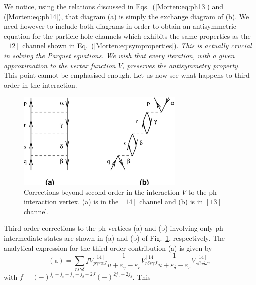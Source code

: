 We notice, using the relations discussed
in Eqs.~(\ref{Morten:eq:ph13})
and (\ref{Morten:eq:ph14}), that diagram (a) is simply the 
exchange diagram of (b). We need however to include
both diagrams in order to obtain an
antisymmetric equation for the particle-hole channels
which exhibits the same properties as the $[12]$ channel
shown in Eq.~(\ref{Morten:eq:symproperties}). {\em This is actually crucial
in solving the Parquet equations. We wish that 
every iteration, with a given approximation to the 
vertex function $V$, preserves the antisymmetry property.}
This point cannot be emphasised enough. Let us now see what 
happens to third order in the interaction.
\begin{figure}[tbh]
	\begin{center}
      	\includegraphics[width=8cm]{thirdph.eps}
	\end{center}
      \caption{Corrections beyond second order in the interaction $V$ 
               to the ph
               interaction vertex. (a) is in the $[14]$ channel and (b) is in
               $[13]$ channel.}
      \label{Morten:fig:phhigher}
\end{figure}
Third order corrections to the ph vertices (a) and (b)   
 involving only ph intermediate states are
shown in (a) and (b) of Fig.~\ref{Morten:fig:phhigher}, respectively.
The analytical expression for the third-order contribution (a) is given by
\begin{equation}
      \mathrm{(a)}=\sum_{rs\gamma\delta}f
      V^{[14]}_{p\gamma r\alpha J}
      \frac{1}{u+\varepsilon_{\gamma}
       -\varepsilon_{r} } V^{[14]}_{r\delta s\gamma J}
      \frac{1}{u+\varepsilon_{\delta}
       -\varepsilon_{s} } V^{[14]}_{s\beta q\delta J},
       \label{Morten:eq:thirdpha}
\end{equation}
with $f=(-)^{j_r+j_s+j_{\gamma}+j_{\delta}-2J}
      (-)^{2j_{\gamma}+2j_{\delta}}$. This

